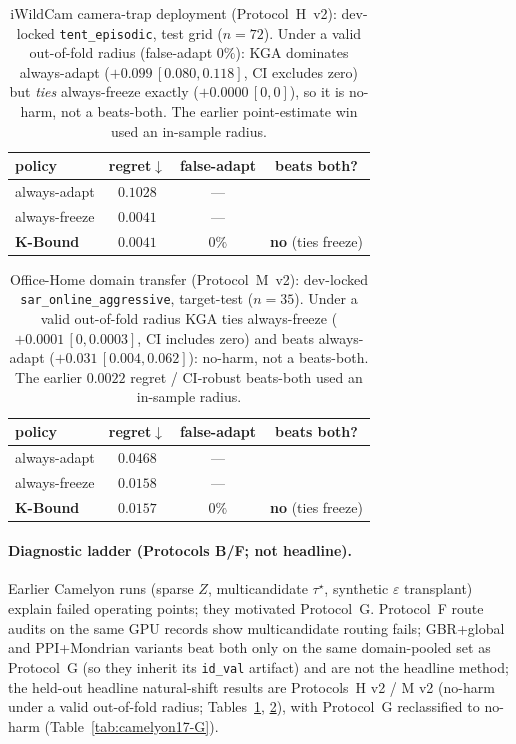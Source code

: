 \documentclass[conference]{IEEEtran}
\theoremstyle{plain}
\theoremstyle{definition}
\begin{document}
\begin{table}[t]\centering\small
\caption{iWildCam camera-trap deployment (Protocol~H~v2): dev-locked \texttt{tent\_episodic}, test grid ($n{=}72$).
Under a valid out-of-fold radius (false-adapt $0\%$): \textsc{KGA} dominates always-adapt
($+0.099\,[0.080,0.118]$, CI excludes zero) but \emph{ties} always-freeze exactly
($+0.0000\,[0,0]$), so it is no-harm, not a beats-both. The earlier point-estimate win used an
in-sample radius.}
\label{tab:iwildcam-H}
\begin{tabular}{lccc}
\toprule
policy & regret$\downarrow$ & false-adapt & beats both? \\
\midrule
always-adapt  & $0.1028$ & --- & \\
always-freeze & $0.0041$ & --- & \\
\textbf{K-Bound} & $0.0041$ & $0\%$ & \textbf{no} (ties freeze) \\
\bottomrule
\end{tabular}
\end{table}

\begin{table}[t]\centering\small
\caption{Office-Home domain transfer (Protocol~M~v2): dev-locked \texttt{sar\_online\_aggressive}, target-test
($n{=}35$). Under a valid out-of-fold radius \textsc{KGA} ties always-freeze
($+0.0001\,[0,0.0003]$, CI includes zero) and beats always-adapt ($+0.031\,[0.004,0.062]$): no-harm,
not a beats-both. The earlier $0.0022$ regret / CI-robust beats-both used an in-sample radius.}
\label{tab:officehome-M}
\begin{tabular}{lccc}
\toprule
policy & regret$\downarrow$ & false-adapt & beats both? \\
\midrule
always-adapt  & $0.0468$ & --- & \\
always-freeze & $0.0158$ & --- & \\
\textbf{K-Bound} & $0.0157$ & $0\%$ & \textbf{no} (ties freeze) \\
\bottomrule
\end{tabular}
\end{table}
\FloatBarrier

\paragraph{Diagnostic ladder (Protocols B/F; not headline).}
Earlier Camelyon runs (sparse $Z$, multicandidate $\tau^\star$, synthetic $\varepsilon$ transplant)
explain failed operating points; they motivated Protocol~G. Protocol~F route audits on the same GPU
records show multicandidate routing fails; GBR+global and PPI+Mondrian variants beat both only on
the same domain-pooled set as Protocol~G (so they inherit its \texttt{id\_val} artifact) and are
not the headline method; the held-out headline natural-shift results are Protocols~H v2 / M v2
(no-harm under a valid out-of-fold radius; Tables~\ref{tab:iwildcam-H}, \ref{tab:officehome-M}),
with Protocol~G reclassified to no-harm (Table~\ref{tab:camelyon17-G}).
\end{document}
